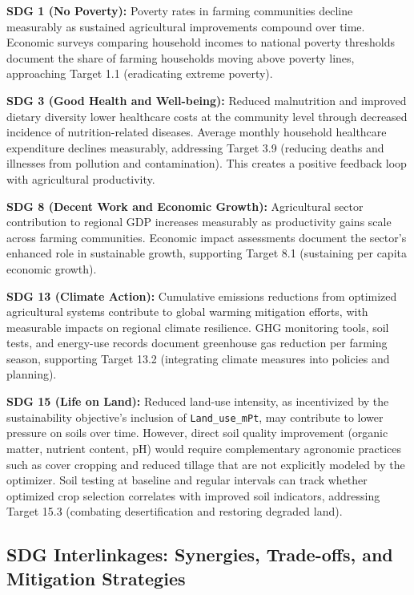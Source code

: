 \documentclass{oqireport}
\begin{document}
\textbf{SDG 1 (No Poverty):} Poverty rates in farming communities decline measurably as sustained agricultural improvements compound over time. Economic surveys comparing household incomes to national poverty thresholds document the share of farming households moving above poverty lines, approaching Target 1.1 (eradicating extreme poverty).

\textbf{SDG 3 (Good Health and Well-being):} Reduced malnutrition and improved dietary diversity lower healthcare costs at the community level through decreased incidence of nutrition-related diseases. Average monthly household healthcare expenditure declines measurably, addressing Target 3.9 (reducing deaths and illnesses from pollution and contamination). This creates a positive feedback loop with agricultural productivity.

\textbf{SDG 8 (Decent Work and Economic Growth):} Agricultural sector contribution to regional GDP increases measurably as productivity gains scale across farming communities. Economic impact assessments document the sector's enhanced role in sustainable growth, supporting Target 8.1 (sustaining per capita economic growth).

\textbf{SDG 13 (Climate Action):} Cumulative emissions reductions from optimized agricultural systems contribute to global warming mitigation efforts, with measurable impacts on regional climate resilience. GHG monitoring tools, soil tests, and energy-use records document greenhouse gas reduction per farming season, supporting Target 13.2 (integrating climate measures into policies and planning).

\textbf{SDG 15 (Life on Land):} Reduced land-use intensity, as incentivized by the sustainability objective's inclusion of \texttt{Land\_use\_mPt}, may contribute to lower pressure on soils over time. However, direct soil quality improvement (organic matter, nutrient content, pH) would require complementary agronomic practices such as cover cropping and reduced tillage that are not explicitly modeled by the optimizer. Soil testing at baseline and regular intervals can track whether optimized crop selection correlates with improved soil indicators, addressing Target 15.3 (combating desertification and restoring degraded land).

\subsection{SDG Interlinkages: Synergies, Trade-offs, and Mitigation Strategies}
\end{document}
